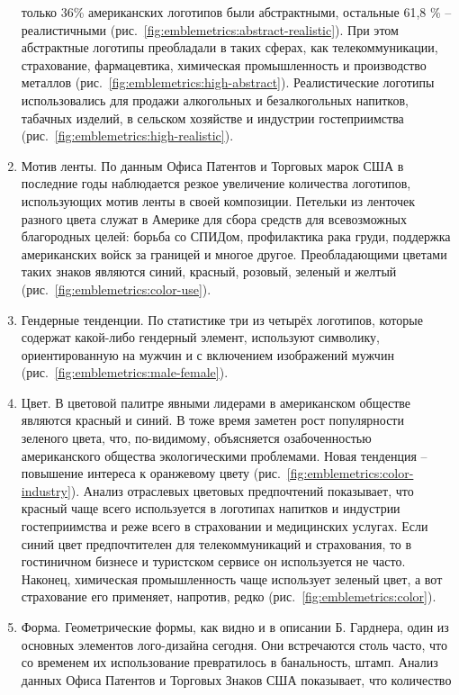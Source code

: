 \begin{enumerate}
  только 36\% американских логотипов были абстрактными, остальные 61,8 \% -- реалистичными
  (рис.~\ref{fig:emblemetrics:abstract-realistic}). При этом абстрактные логотипы преобладали в
  таких сферах, как телекоммуникации, страхование, фармацевтика, химическая промышленность и
  производство металлов (рис.~\ref{fig:emblemetrics:high-abstract}). Реалистические логотипы
  использовались для продажи алкогольных и безалкогольных напитков, табачных изделий, в сельском
  хозяйстве и индустрии гостеприимства (рис.~\ref{fig:emblemetrics:high-realistic}).
\item Мотив ленты. По данным Офиса Патентов и Торговых марок США в последние годы наблюдается резкое
  увеличение количества логотипов, использующих мотив ленты в своей композиции. Петельки из ленточек
  разного цвета служат в Америке для сбора средств для всевозможных благородных целей: борьба со
  СПИДом, профилактика рака груди, поддержка американских войск за границей и многое
  другое. Преобладающими цветами таких знаков являются синий, красный, розовый, зеленый и желтый
  (рис.~\ref{fig:emblemetrics:color-use}).
\item Гендерные тенденции. По статистике три из четырёх логотипов, которые содержат какой-либо
  гендерный элемент, используют символику, ориентированную на мужчин и с включением изображений
  мужчин (рис.~\ref{fig:emblemetrics:male-female}).
\item Цвет. В цветовой палитре явными лидерами в американском обществе являются красный и синий. В
  тоже время заметен рост популярности зеленого цвета, что, по-видимому, объясняется  озабоченностью
  американского общества экологическими проблемами. Новая тенденция -- повышение интереса к
  оранжевому цвету (рис.~\ref{fig:emblemetrics:color-industry}). Анализ отраслевых цветовых
  предпочтений показывает, что красный чаще всего используется в логотипах напитков и индустрии
  гостеприимства и реже всего в страховании и медицинских услугах. Если  синий цвет предпочтителен
  для  телекоммуникаций и страхования, то в гостиничном бизнесе и туристском сервисе он используется
  не часто. Наконец, химическая промышленность чаще использует зеленый цвет, а вот страхование его
  применяет, напротив, редко (рис.~\ref{fig:emblemetrics:color}).
\item Форма. Геометрические формы, как видно и в описании Б. Гарднера, один из основных элементов
  лого-дизайна сегодня. Они встречаются столь часто, что со временем их использование превратилось в
  банальность, штамп. Анализ данных Офиса Патентов и Торговых Знаков США показывает, что  количество

\end{enumerate}
